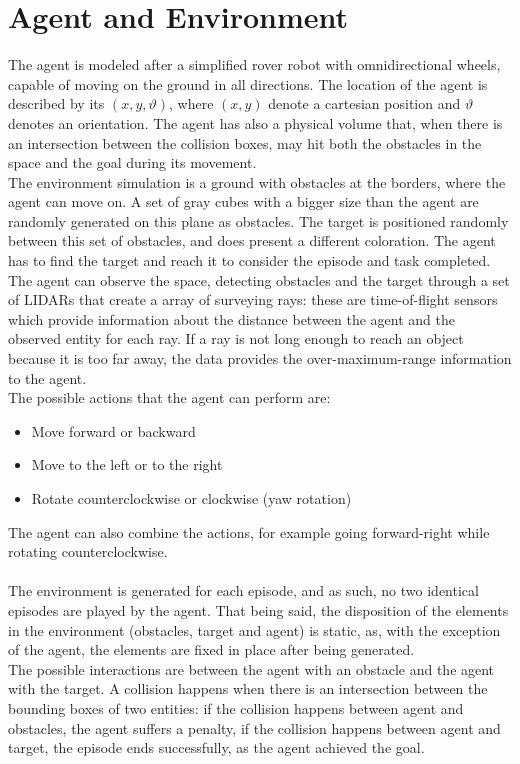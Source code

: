 \documentclass{ifacconf}
\begin{document}
\section{Agent and Environment}
The agent is modeled after a simplified rover robot with omnidirectional wheels, capable of moving on the ground in all directions. The location of the agent is described by its $(x, y, \vartheta)$,
where $(x, y)$ denote a cartesian position and $\vartheta$ denotes an orientation. The agent has also a physical volume that, when there is an intersection between the collision boxes, may hit both the obstacles in the space and the goal during its movement.\\
The environment simulation is a ground with obstacles at the borders, where the agent can move on. A set of gray cubes with a bigger size than the agent are randomly generated on this plane as obstacles. The target is positioned randomly between this set of obstacles, and does present a different coloration. The agent has to find the target and reach it to consider the episode and task completed.\\
The agent can observe the space, detecting obstacles and the target through a set of LIDARs that create a array of surveying rays: these are time-of-flight sensors which provide information about the distance between the agent and the observed entity for each ray. If a ray is not long enough to reach an object because it is too far away, the data provides the over-maximum-range information to the agent.\\
The possible actions that the agent can perform are:
\begin{itemize}
    \item Move forward or backward
    \item Move to the left or to the right
    \item Rotate counterclockwise or clockwise (yaw rotation)
\end{itemize}
The agent can also combine the actions, for example going forward-right while rotating counterclockwise.\\\\

The environment is generated for each episode, and as such, no two identical episodes are played by the agent. That being said, the disposition of the elements in the environment (obstacles, target and agent) is static, as, with the exception of the agent, the elements are fixed in place after being generated.\\
The possible interactions are between the agent with an obstacle and the agent with the target. A collision happens when there is an intersection between the bounding boxes of two entities: if the collision happens between agent and obstacles, the agent suffers a penalty, if the collision happens between agent and target, the episode ends successfully, as the agent achieved the goal. 
\end{document}
